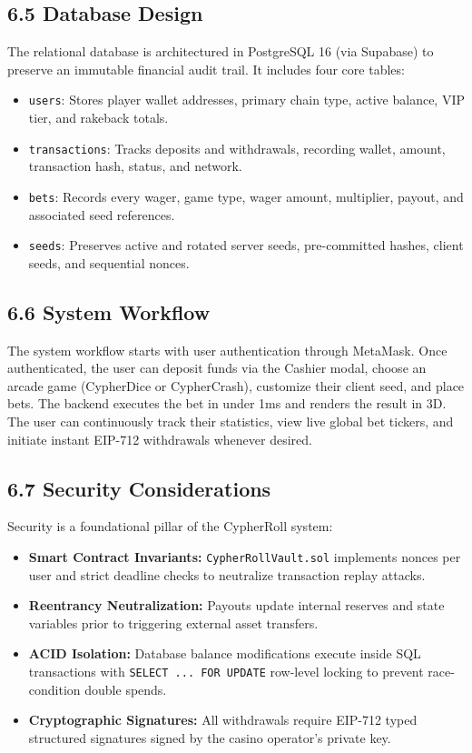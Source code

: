 \subsection*{6.5 Database Design}
The relational database is architectured in PostgreSQL 16 (via Supabase) to preserve an immutable financial audit trail. It includes four core tables:
\begin{itemize}[leftmargin=1.5em]
    \item \texttt{users}: Stores player wallet addresses, primary chain type, active balance, VIP tier, and rakeback totals.
    \item \texttt{transactions}: Tracks deposits and withdrawals, recording wallet, amount, transaction hash, status, and network.
    \item \texttt{bets}: Records every wager, game type, wager amount, multiplier, payout, and associated seed references.
    \item \texttt{seeds}: Preserves active and rotated server seeds, pre-committed hashes, client seeds, and sequential nonces.
\end{itemize}

\subsection*{6.6 System Workflow}
The system workflow starts with user authentication through MetaMask. Once authenticated, the user can deposit funds via the Cashier modal, choose an arcade game (CypherDice or CypherCrash), customize their client seed, and place bets. The backend executes the bet in under 1ms and renders the result in 3D. The user can continuously track their statistics, view live global bet tickers, and initiate instant EIP-712 withdrawals whenever desired.

\subsection*{6.7 Security Considerations}
Security is a foundational pillar of the CypherRoll system:
\begin{itemize}[leftmargin=1.5em]
    \item \textbf{Smart Contract Invariants:} \texttt{CypherRollVault.sol} implements nonces per user and strict deadline checks to neutralize transaction replay attacks.
    \item \textbf{Reentrancy Neutralization:} Payouts update internal reserves and state variables prior to triggering external asset transfers.
    \item \textbf{ACID Isolation:} Database balance modifications execute inside SQL transactions with \texttt{SELECT ... FOR UPDATE} row-level locking to prevent race-condition double spends.
    \item \textbf{Cryptographic Signatures:} All withdrawals require EIP-712 typed structured signatures signed by the casino operator's private key.
\end{itemize}

